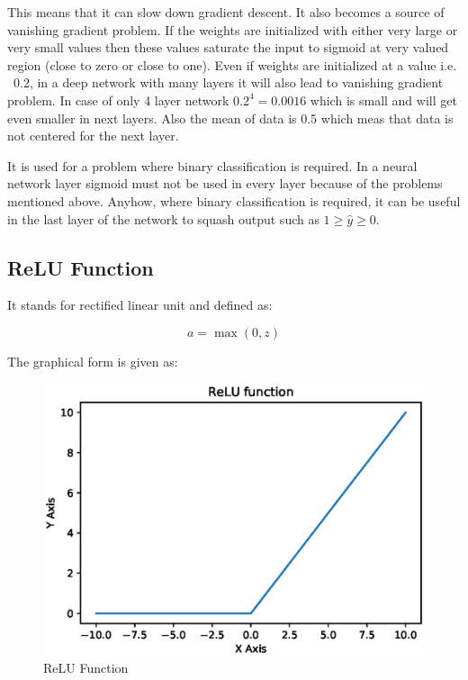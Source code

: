 \documentclass[11pt]{article}
\begin{document}
This means that it can slow down gradient descent. It also becomes a source of vanishing gradient problem. If the weights are initialized with either very large or very small values then these values saturate the input to sigmoid at very valued region (close to zero or close to one). Even if weights are initialized at a value i.e. ~0.2, in a deep network with many layers it will also lead to vanishing gradient problem. In case of only 4 layer network $0.2^{4}=0.0016$ which is small and will get even smaller in next layers. Also the mean of data is 0.5 which meas that data is not centered for the next layer. 

It is used for a problem where binary classification is required. In a neural network layer sigmoid must not be used in every layer because of the problems mentioned above. Anyhow, where binary classification is required, it can be useful in the last layer of the network to squash output such as $ 1 \geq \hat{y} \geq 0$.

\subsection{ReLU Function}
It stands for rectified linear unit and defined as:

\begin{equation}
a = \max (0, z)
\end{equation}

The graphical form is given as:

\begin{figure}[H]
	\includegraphics[width=\linewidth]{files/cnn_architecture/relu.eps}
	\caption{ReLU Function}
	\label{fig: relu}
\end{figure}
\end{document}
